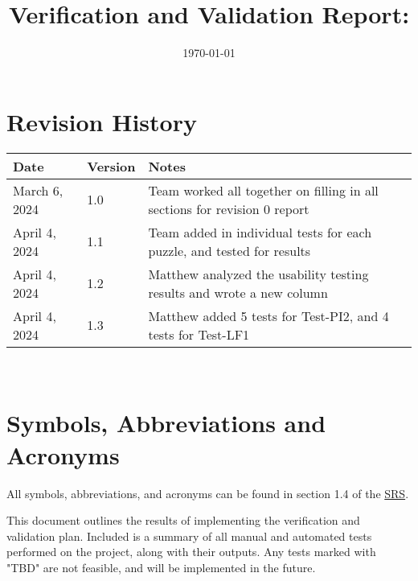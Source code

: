 \documentclass[12pt, titlepage]{article}
\begin{document}
\title{Verification and Validation Report: \progname} 
\author{\authname}
\date{\today}
	
\maketitle


\section{Revision History}

\begin{tabularx}{\textwidth}{p{3cm}p{2cm}X}
\toprule {\bf Date} & {\bf Version} & {\bf Notes}\\
\midrule
March 6, 2024 & 1.0 & Team worked all together on filling in all sections for revision 0 report\\
April 4, 2024 & 1.1 & Team added in individual tests for each puzzle, and tested for results\\
April 4, 2024 & 1.2 & Matthew analyzed the usability testing results and wrote a new column\\
April 4, 2024 & 1.3 & Matthew added 5 tests for Test-PI2, and 4 tests for Test-LF1\\
\bottomrule
\end{tabularx}

~\newpage

\section{Symbols, Abbreviations and Acronyms}

\renewcommand{\arraystretch}{1.2}
All  symbols, abbreviations, and acronyms can be found in section 1.4 of the  \href{https://github.com/SammyG7/Mac-AR/blob/main/docs/SRS/SRS.pdf}{SRS}.


\newpage

\tableofcontents

\listoftables %

\newpage


This document outlines the results of implementing the verification and validation plan. Included is a summary of all manual and automated tests performed on the project, along with their outputs. Any tests marked with "TBD" are not feasible, and will be implemented in the future. 
\end{document}

